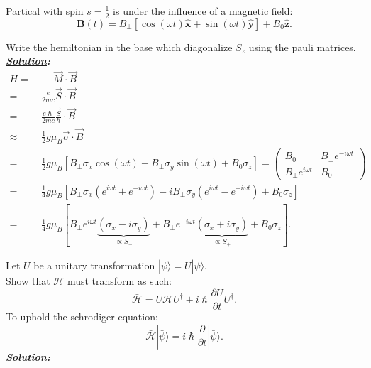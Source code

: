 \documentclass[notitlepage]{report}
\begin{document}
\begin{question}[title = Question 6]{}{}
Partical with spin $s=\frac{1}{2}$ is under the influence of a magnetic field:\\
\[
	\boldsymbol{B}\left(t\right)=B_{\perp} \left[\cos\left(\omega t\right)\hat{\boldsymbol{x}}+\sin\left(\omega t\right)\hat{\boldsymbol{y}}\right]+B_0\boldsymbol{\hat{z}}  	
.\] 
\begin{question}[title = Parts 1+2]{}{}
Write the hemiltonian in the base which diagonalize $S_z $ using the pauli matrices.
\tcblower
\textbf{\emph{\underline{Solution}:}}\\
\begin{align*}
	H =&\ -\vec{M}\cdot \vec{B}\\
	=&\ \frac{e}{2mc}\vec{S}\cdot \vec{B}\\
	=&\ \frac{e\hslash}{2mc}\frac{\vec{S}}{\hslash}\cdot \vec{B}\\
	\approx&\ \frac{1}{2}g\mu_B \vec{\sigma}\cdot \vec{B}\\
	=&\ \frac{1}{2}g\mu_B \left[B_{\perp}\sigma_x\cos\left(\omega t\right)+B_{\perp}\sigma_y\sin\left(\omega t\right)+B_0\sigma_z\right] = 
	\begin{pmatrix}
		B_0 & B_{\perp}e^{-i\omega t}\\
		B_{\perp}e^{i\omega t} & B_0
	\end{pmatrix}\\
	=&\ \frac{1}{4}g\mu_B \left[B_{\perp}\sigma_x\left(e^{i\omega t}+e^{-i\omega t}\right) -iB_{\perp}\sigma_y\left(e^{i\omega t}-e^{-i\omega t}\right)+B_0\sigma_z\right] \\
	=&\ \frac{1}{4}g\mu_B \left[B_{\perp}e^{i\omega t}\underbrace{\left(\sigma_x-i\sigma_y\right)}_{\propto S_{-}}+B_{\perp}e^{-i\omega t}\underbrace{\left(\sigma_x+i\sigma_y\right)}_{\propto S_{+}}+B_0\sigma_z\right]
.\end{align*}
\end{question}
\begin{question}[title = Part 3]{}{}
Let $U$ be a unitary transformation $|\bar{\psi}\rangle=U|\psi\rangle$.\\
Show that $\mathcal{H}$ must transform as such:\\
 \[
	\bar{\mathcal{H}}=U\mathcal{H}U^{\dagger}+i\hslash\frac{\partial U}{\partial t}U^{\dag} 
.\] 
To uphold the schrodiger equation:\\
\[
	\bar{\mathcal{H}}|\bar{\psi}\rangle=i\hslash\frac{\partial}{\partial t}|\bar{\psi}\rangle 
.\]
\tcblower
\textbf{\emph{\underline{Solution}:}}\\

\end{question}
\end{question}
\end{document}

